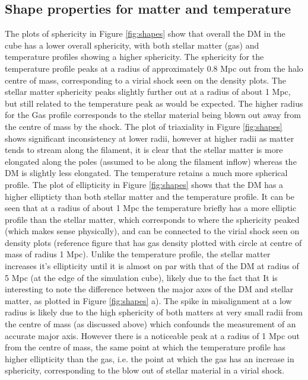 \documentclass[journal]{IEEEtran}
\begin{document}
\subsection{Shape properties for matter and temperature}
The plots of sphericity in Figure \ref{fig:shapes} show that overall the DM in the cube has a lower overall sphericity, with both stellar matter (gas) and temperature profiles showing a higher sphericity. The sphericity for the temperature profile peaks at a radius of approximately 0.8 Mpc out from the halo centre of mass, corresponding to a virial shock seen on the density plots. The stellar matter sphericity peaks slightly further out at a radius of about 1 Mpc, but still related to the temperature peak as would be expected. The higher radius for the Gas profile corresponds to the stellar material being blown out away from the centre of mass by the shock. 
The plot of triaxiality in Figure \ref{fig:shapes} shows significant inconsistency at lower radii, however at higher radii as matter tends to stream along the filament, it is clear that the stellar matter is more elongated along the poles (assumed to be along the filament inflow) whereas the DM is slightly less elongated. The temperature retains a much more spherical profile.
The plot of ellipticity in Figure \ref{fig:shapes} shows that the DM has a higher ellipticty than both stellar matter and the temperature profile. It can be seen that at a radius of about 1 Mpc the temperature briefly has a more elliptic profile than the stellar matter, which corresponds to where the sphericity peaked (which makes sense physically), and can be connected to the virial shock seen on density plots (reference figure that has gas density plotted with circle at centre of mass of radius 1 Mpc). Unlike the temperature profile, the stellar matter increases it's ellipticity until it is almost on par with that of the DM at radius of 5 Mpc (at the edge of the simulation cube), likely due to the fact that 
It is interesting to note the difference between the major axes of the DM and stellar matter, as plotted in Figure \ref{fig:shapes} a). The spike in misalignment at a low radius is likely due to the high sphericity of both matters at very small radii from the centre of mass (as discussed above) which confounds the measurement of an accurate major axis. However there is a noticeable peak at a radius of 1 Mpc out from the centre of mass, the same point at which the temperature profile has higher ellipticity than the gas, i.e. the point at which the gas has an increase in sphericity, corresponding to the blow out of stellar material in a virial shock.
\end{document}
